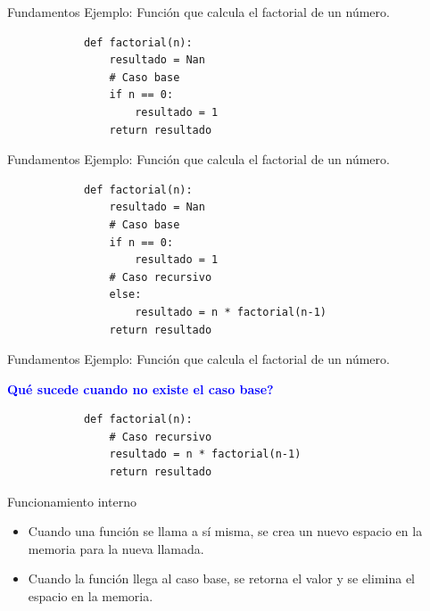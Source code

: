 \documentclass{beamer}
\begin{document}
    \begin{frame}[fragile, t]{Fundamentos}
        Ejemplo: Función que calcula el factorial de un número.
        \begin{verbatim}
            def factorial(n):
                resultado = Nan
                # Caso base
                if n == 0:
                    resultado = 1
                return resultado
        \end{verbatim}
    \end{frame}

    \begin{frame}[fragile, t]{Fundamentos}
        Ejemplo: Función que calcula el factorial de un número.
        \begin{verbatim}
            def factorial(n):
                resultado = Nan
                # Caso base
                if n == 0:
                    resultado = 1
                # Caso recursivo
                else:
                    resultado = n * factorial(n-1)
                return resultado
        \end{verbatim}
    \end{frame}

    \begin{frame}[fragile, t]{Fundamentos}
        Ejemplo: Función que calcula el factorial de un número.

        \textcolor{blue}{\textbf{Qué sucede cuando no existe el caso base?}}
        \begin{verbatim}
            def factorial(n):
                # Caso recursivo
                resultado = n * factorial(n-1)
                return resultado
        \end{verbatim}
    \end{frame}

    \begin{frame}[fragile, t]{Funcionamiento interno}
        \begin{itemize}
            \item Cuando una función se llama a sí misma, se crea un nuevo espacio en la memoria para la nueva llamada.
            \item Cuando la función llega al caso base, se retorna el valor y se elimina el espacio en la memoria.
        \end{itemize}
    \end{frame}
\end{document}
